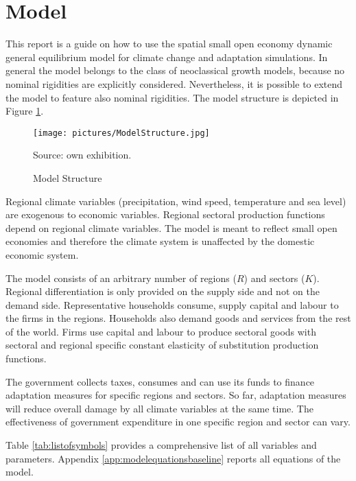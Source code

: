 \documentclass[10pt,a4paper]{article}
\begin{document}
\section{Model}\label{sec:modelderivation}
This report is a guide on how to use the spatial small open economy dynamic general equilibrium model for climate change and adaptation simulations. In general the model belongs to the class of neoclassical growth models, because no nominal rigidities are explicitly considered. Nevertheless, it is possible to extend the model to feature also nominal rigidities. The model structure is depicted in Figure \ref{fig:ModelStructure}.
\begin{figure}[h]
\caption{Model Structure}\label{fig:ModelStructure}
\begin{center}
\texttt{[image: pictures/ModelStructure.jpg]}
\end{center}
\footnotesize{Source: own exhibition.}
\end{figure}
Regional climate variables (precipitation, wind speed, temperature and sea level) are exogenous to economic variables. Regional sectoral production functions depend on regional climate variables. The model is meant to reflect small open economies and therefore the climate system is unaffected by the domestic economic system.

The model consists of an arbitrary number of regions ($R$) and sectors ($K$). Regional differentiation is only provided on the supply side and not on the demand side. Representative households consume, supply capital and labour to the firms in the regions. Households also demand goods and services from the rest of the world. Firms use capital and labour to produce sectoral goods with sectoral and regional specific constant elasticity of substitution production functions.

The government collects taxes, consumes and can use its funds to finance adaptation measures for specific regions and sectors. So far, adaptation measures will reduce overall damage by all climate variables at the same time. The effectiveness of government expenditure in one specific region and sector can vary.


Table \ref{tab:listofsymbols} provides a comprehensive list of all variables and parameters. Appendix \ref{app:modelequationsbaseline} reports all equations of the model.
\end{document}
